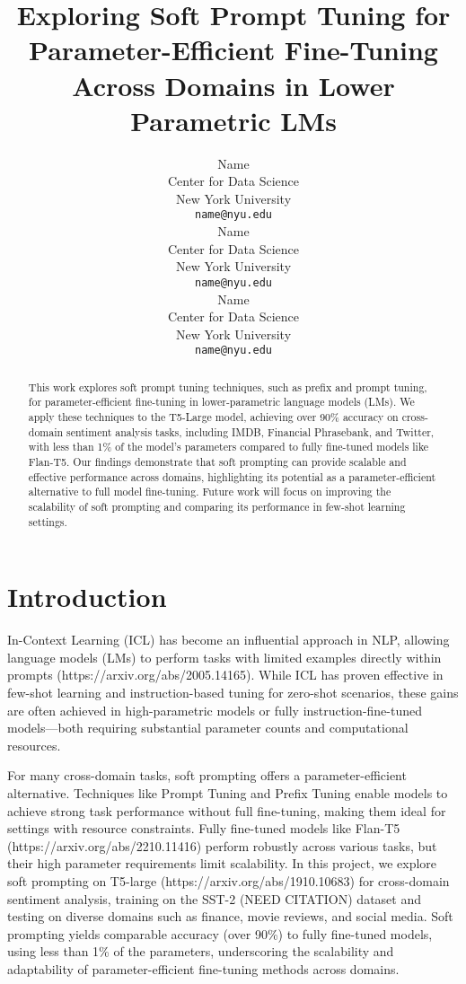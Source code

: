 \documentclass{article}
\title{
  Exploring Soft Prompt Tuning for Parameter-Efficient Fine-Tuning Across Domains in Lower Parametric LMs
}
\author{
  Name \\
  Center for Data Science \\
  New York University \\
  \texttt{name@nyu.edu} \\
  \And
  Name \\
  Center for Data Science \\
  New York University \\
  \texttt{name@nyu.edu} \\
  \And
  Name \\
  Center for Data Science \\
  New York University \\
  \texttt{name@nyu.edu} \\
}
\begin{document}
\maketitle

\begin{abstract}
  This work explores soft prompt tuning techniques, such as prefix and prompt tuning, for parameter-efficient fine-tuning in lower-parametric language models (LMs). We apply these techniques to the T5-Large model, achieving over 90\% accuracy on cross-domain sentiment analysis tasks, including IMDB, Financial Phrasebank, and Twitter, with less than 1\% of the model’s parameters compared to fully fine-tuned models like Flan-T5. Our findings demonstrate that soft prompting can provide scalable and effective performance across domains, highlighting its potential as a parameter-efficient alternative to full model fine-tuning. Future work will focus on improving the scalability of soft prompting and comparing its performance in few-shot learning settings.
\end{abstract}

\section{Introduction}
In-Context Learning (ICL) has become an influential approach in NLP, allowing language models (LMs) to perform tasks with limited examples directly within prompts (https://arxiv.org/abs/2005.14165). While ICL has proven effective in few-shot learning and instruction-based tuning for zero-shot scenarios, these gains are often achieved in high-parametric models or fully instruction-fine-tuned models—both requiring substantial parameter counts and computational resources.

For many cross-domain tasks, soft prompting offers a parameter-efficient alternative. Techniques like Prompt Tuning and Prefix Tuning enable models to achieve strong task performance without full fine-tuning, making them ideal for settings with resource constraints. Fully fine-tuned models like Flan-T5 (https://arxiv.org/abs/2210.11416) perform robustly across various tasks, but their high parameter requirements limit scalability. In this project, we explore soft prompting on T5-large (https://arxiv.org/abs/1910.10683) for cross-domain sentiment analysis, training on the SST-2 (NEED CITATION) dataset and testing on diverse domains such as finance, movie reviews, and social media. Soft prompting yields comparable accuracy (over 90\%) to fully fine-tuned models, using less than 1\% of the parameters, underscoring the scalability and adaptability of parameter-efficient fine-tuning methods across domains.
\end{document}
